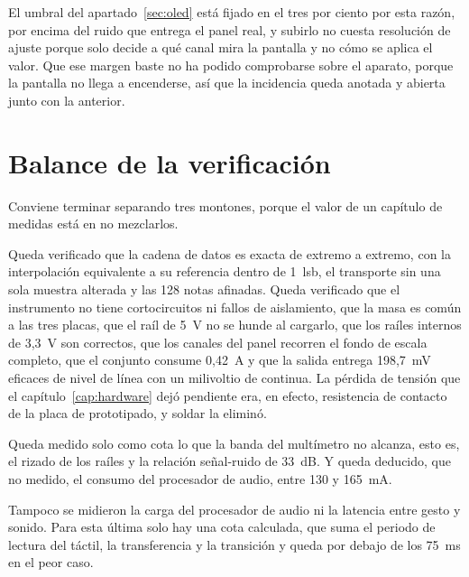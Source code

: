 El umbral del apartado~\ref{sec:oled} está fijado en el tres por ciento por
esta razón, por encima del ruido que entrega el panel real, y subirlo no cuesta
resolución de ajuste porque solo decide a qué canal mira la pantalla y no cómo
se aplica el valor. Que ese margen baste no ha podido comprobarse sobre el
aparato, porque la pantalla no llega a encenderse, así que la incidencia queda
anotada y abierta junto con la anterior.

\section{Balance de la verificación}
\label{sec:balance}

Conviene terminar separando tres montones, porque el valor de un capítulo de
medidas está en no mezclarlos.

Queda verificado que la cadena de datos es exacta de extremo a extremo, con la
interpolación equivalente a su referencia dentro de 1~\gls{lsb}, el transporte
sin una sola muestra alterada y las 128 notas afinadas. Queda verificado que
el instrumento no tiene cortocircuitos ni fallos de aislamiento, que la masa es
común a las tres placas, que el raíl de 5~V no se hunde al cargarlo, que los
raíles internos de 3,3~V son correctos, que los canales del panel recorren el
fondo de escala completo, que el conjunto consume 0,42~A y que la salida
entrega 198,7~mV eficaces de nivel de línea con un milivoltio de continua. La
pérdida de tensión que el capítulo~\ref{cap:hardware} dejó pendiente era, en
efecto, resistencia de contacto de la placa de prototipado, y soldar la eliminó.

Queda medido solo como cota lo que la banda del multímetro no alcanza, esto es,
el rizado de los raíles y la relación señal-ruido de 33~dB. Y queda deducido,
que no medido, el consumo del procesador de audio, entre 130 y 165~mA.

Tampoco se midieron la carga del procesador de audio ni la latencia entre gesto 
y sonido. Para esta última solo hay una cota calculada, que suma el periodo de 
lectura del táctil, la transferencia y la transición y queda por debajo de los 
75~ms en el peor caso.

